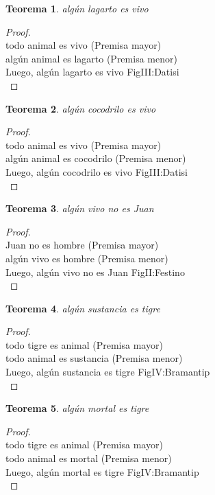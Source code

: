 ﻿\documentclass[12pt]{book}
\newtheorem{theorem}{Teorema}[chapter]
\newtheorem{proof}{Demostración}
\begin{document}
\begin{theorem}
algún lagarto es vivo
\label{th: 54}
\end{theorem}\begin{proof}\\todo animal es vivo	 (Premisa mayor) \\algún animal es lagarto	 (Premisa menor) \\Luego, algún lagarto es vivo	FigIII:Datisi \\ \end{proof}
\begin{theorem}
algún cocodrilo es vivo
\label{th: 55}
\end{theorem}\begin{proof}\\todo animal es vivo	 (Premisa mayor) \\algún animal es cocodrilo	 (Premisa menor) \\Luego, algún cocodrilo es vivo	FigIII:Datisi \\ \end{proof}
\begin{theorem}
algún vivo no es Juan
\label{th: 56}
\end{theorem}\begin{proof}\\Juan no es hombre	 (Premisa mayor) \\algún vivo es hombre	 (Premisa menor) \\Luego, algún vivo no es Juan	FigII:Festino \\ \end{proof}
\begin{theorem}
algún sustancia es tigre
\label{th: 57}
\end{theorem}\begin{proof}\\todo tigre es animal	 (Premisa mayor) \\todo animal es sustancia	 (Premisa menor) \\Luego, algún sustancia es tigre	FigIV:Bramantip \\ \end{proof}
\begin{theorem}
algún mortal es tigre
\label{th: 58}
\end{theorem}\begin{proof}\\todo tigre es animal	 (Premisa mayor) \\todo animal es mortal	 (Premisa menor) \\Luego, algún mortal es tigre	FigIV:Bramantip \\ \end{proof}
\end{document}
